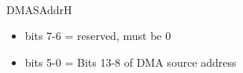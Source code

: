 \\
DMASAddrH
\begin{itemize}
\item bits 7-6 = reserved, must be 0
\item bits 5-0 = Bits 13-8 of DMA source address
\end{itemize}

